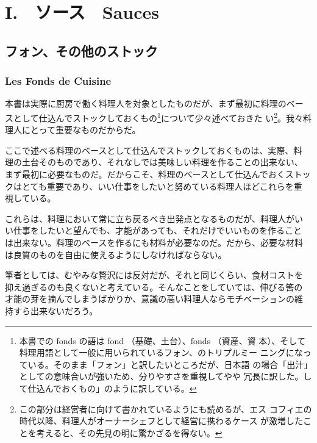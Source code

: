 \hypertarget{i.ux30bdux30fcux30b9sauces}{%
\chapter{I.　ソース　Sauces}\label{i.ux30bdux30fcux30b9sauces}}

\hypertarget{ux30d5ux30a9ux30f3ux305dux306eux4ed6ux306eux30b9ux30c8ux30c3ux30af}{%
\section{フォン、その他のストック}\label{ux30d5ux30a9ux30f3ux305dux306eux4ed6ux306eux30b9ux30c8ux30c3ux30af}}

\hypertarget{les-fonds-de-cuisine}{%
\subsection{Les Fonds de Cuisine}\label{les-fonds-de-cuisine}}

 

本書は実際に厨房で働く料理人を対象としたものだが、まず最初に料理のベー
スとして仕込んでストックしておくもの\footnote{本書での fonds の語は fond
  （基礎、土台）、fonds （資産、資
  本）、そして料理用語として一般に用いられているフォン、のトリプルミー
  ニングになっている。そのまま「フォン」と訳したいところだが、日本語
  の場合「出汁」としての意味合いが強いため、分りやすさを重視してやや
  冗長に訳した。して仕込んでおくもの」のように訳している。}について少々述べておきた
い\footnote{この部分は経営者に向けて書かれているようにも読めるが、エス
  コフィエの時代以降、料理人がオーナーシェフとして経営に携わるケース
  が激増したことを考えると、その先見の明に驚かざるを得ない。}。我々料理人にとって重要なものだからだ。

ここで述べる料理のベースとして仕込んでストックしておくものは、実際、料
理の土台そのものであり、それなしでは美味しい料理を作ることの出来ない、
まず最初に必要なものだ。だからこそ、料理のベースとして仕込んでおくストッ
クはとても重要であり、いい仕事をしたいと努めている料理人ほどこれらを重
視している。

これらは、料理において常に立ち戻るべき出発点となるものだが、料理人がい
い仕事をしたいと望んでも、才能があっても、それだけでいいものを作ること
は出来ない。料理のベースを作るにも材料が必要なのだ。だから、必要な材料
は良質のものを自由に使えるようにしなければならない。

筆者としては、むやみな贅沢には反対だが、それと同じくらい、食材コストを
抑え過ぎるのも良くないと考えている。そんなことをしていては、伸びる筈の
才能の芽を摘んでしまうばかりか、意識の高い料理人ならモチベーションの維
持すら出来ないだろう。


